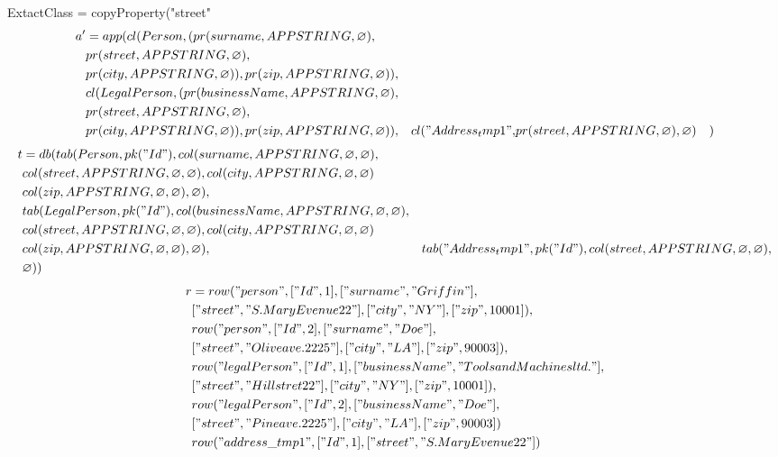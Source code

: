 \documentclass[11pt]{article}
\begin{document}
ExtactClass = copyProperty("street"
\begin{align*}
a' &= app(cl(Person, (pr(surname, APPSTRING, \varnothing), \\
& pr(street, APPSTRING, \varnothing), \\
& pr(city, APPSTRING, \varnothing)), pr(zip, APPSTRING, \varnothing)), \\
& cl(LegalPerson, (pr(businessName, APPSTRING, \varnothing), \\
& pr(street, APPSTRING, \varnothing), \\
& pr(city, APPSTRING, \varnothing)), pr(zip, APPSTRING, \varnothing)),
& cl("Address_tmp1", & pr(street, APPSTRING, \varnothing) , \varnothing)
& )
\end{align*}
\begin{align*}
t &= db(tab(Person, pk("Id"), col(surname, APPSTRING, \varnothing, \varnothing), \\
& col(street, APPSTRING, \varnothing, \varnothing), col(city, APPSTRING, \varnothing, \varnothing) \\
& col(zip, APPSTRING, \varnothing, \varnothing), \varnothing), \\
& tab(LegalPerson, pk("Id"),  col(businessName, APPSTRING, \varnothing, \varnothing), \\
& col(street, APPSTRING, \varnothing, \varnothing), col(city, APPSTRING, \varnothing, \varnothing) \\
& col(zip, APPSTRING, \varnothing, \varnothing), \varnothing),
& tab("Address_tmp1", pk("Id"), col(street, APPSTRING, \varnothing, \varnothing),\\
& \varnothing)) 
\end{align*}
\begin{align*}
r &= row("person", ["Id", 1], ["surname", "Griffin"], \\
& ["street", "S. Mary Evenue 22"], ["city", "NY"], ["zip", 10001]), \\
& row("person", ["Id", 2], ["surname", "Doe"], \\
& ["street", "Olive ave. 2225"], ["city", "LA"], ["zip", 90003]), \\
& row("legalPerson", ["Id", 1], ["businessName", "Tools and Machines ltd."], \\
& ["street", "Hill stret 22"], ["city", "NY"], ["zip", 10001]), \\
& row("legalPerson", ["Id", 2], ["businessName", "Doe"], \\
& ["street", "Pine ave. 2225"], ["city", "LA"], ["zip", 90003])\\
& row("address\_tmp1", ["Id", 1], ["street", "S. Mary Evenue 22"]) \\
\end{align*}
\end{document}
